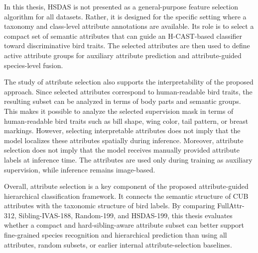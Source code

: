 In this thesis, HSDAS is not presented as a general-purpose feature selection algorithm for all datasets. Rather, it is designed for the specific setting where a taxonomy and class-level attribute annotations are available. Its role is to select a compact set of semantic attributes that can guide an H-CAST-based classifier toward discriminative bird traits. The selected attributes are then used to define active attribute groups for auxiliary attribute prediction and attribute-guided species-level fusion.

The study of attribute selection also supports the interpretability of the proposed approach. Since selected attributes correspond to human-readable bird traits, the resulting subset can be analyzed in terms of body parts and semantic groups. This makes it possible to analyze the selected supervision mask in terms of human-readable bird traits such as bill shape, wing color, tail pattern, or breast markings. However, selecting interpretable attributes does not imply that the model localizes these attributes spatially during inference. Moreover, attribute selection does not imply that the model receives manually provided attribute labels at inference time. The attributes are used only during training as auxiliary supervision, while inference remains image-based.

Overall, attribute selection is a key component of the proposed attribute-guided hierarchical classification framework. It connects the semantic structure of CUB attributes with the taxonomic structure of bird labels. By comparing FullAttr-312, Sibling-IVAS-188, Random-199, and HSDAS-199, this thesis evaluates whether a compact and hard-sibling-aware attribute subset can better support fine-grained species recognition and hierarchical prediction than using all attributes, random subsets, or earlier internal attribute-selection baselines.
